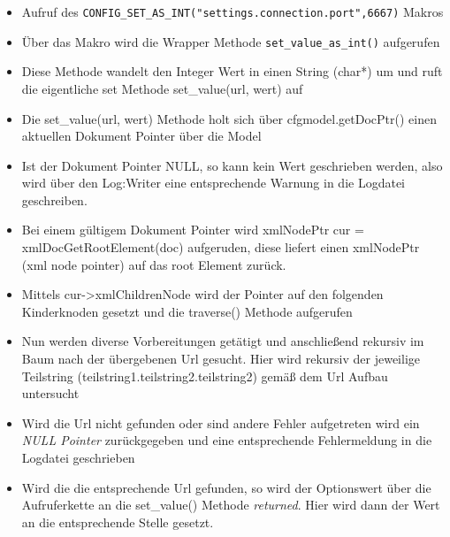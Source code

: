 \begin{itemize}

\item Aufruf des \verb+CONFIG_SET_AS_INT("settings.connection.port",6667)+ Makros
\item Über das Makro wird die Wrapper Methode \verb+set_value_as_int()+ aufgerufen
\item Diese Methode wandelt den Integer Wert in einen String (char*) um und ruft die eigentliche set Methode set\_value(url, wert) auf
\item Die set\_value(url, wert) Methode holt sich über cfgmodel.getDocPtr() einen aktuellen Dokument Pointer über die Model
\item Ist der Dokument Pointer NULL, so kann kein Wert geschrieben werden, also wird über den Log:Writer
          eine entsprechende Warnung in die Logdatei geschreiben.
\item Bei einem gültigem Dokument Pointer wird  xmlNodePtr cur = xmlDocGetRootElement(doc) aufgeruden,
         diese liefert einen xmlNodePtr (xml node pointer) auf das root Element zurück.
\item Mittels cur->xmlChildrenNode wird der Pointer auf den folgenden Kinderknoden gesetzt und die traverse() Methode aufgerufen
\item Nun werden diverse Vorbereitungen getätigt und anschließend rekursiv im Baum nach der übergebenen Url gesucht. Hier wird rekursiv
     der jeweilige Teilstring (teilstring1.teilstring2.teilstring2) gemäß dem Url Aufbau untersucht
           
\item Wird die Url nicht gefunden oder sind andere Fehler aufgetreten wird ein \emph{NULL Pointer} zurückgegeben
                  und eine entsprechende Fehlermeldung in die Logdatei geschrieben
\item Wird die die entsprechende Url gefunden, so wird der Optionswert über die Aufruferkette an die set\_value() Methode \emph{returned}.
     Hier wird dann der Wert an die entsprechende Stelle gesetzt.  
\end{itemize}


